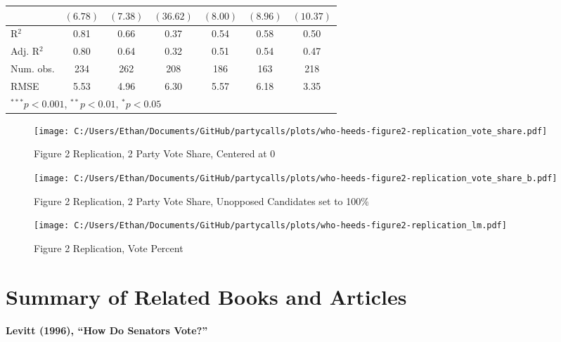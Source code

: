 \documentclass[12pt]{article}
\begin{document}
\begin{table}
\begin{center}
\begin{tabular}{l c c c c c c }
			& $(6.78)$      & $(7.38)$     & $(36.62)$    & $(8.00)$     & $(8.96)$      & $(10.37)$     \\
			\hline
			R$^2$                  & 0.81          & 0.66         & 0.37         & 0.54         & 0.58          & 0.50          \\
			Adj. R$^2$             & 0.80          & 0.64         & 0.32         & 0.51         & 0.54          & 0.47          \\
			Num. obs.              & 234           & 262          & 208          & 186          & 163           & 218           \\
			RMSE                   & 5.53          & 4.96         & 6.30         & 5.57         & 6.18          & 3.35          \\
			\hline
			\multicolumn{7}{l}{\scriptsize{$^{***}p<0.001$, $^{**}p<0.01$, $^*p<0.05$}}
		\end{tabular}
	\end{center}
\end{table}

\begin{figure}[H]
	\centering
	\caption{Figure 2 Replication, 2 Party Vote Share, Centered at 0}
	\texttt{[image: C:/Users/Ethan/Documents/GitHub/partycalls/plots/who-heeds-figure2-replication\_vote\_share.pdf]}
\end{figure}

\begin{figure}[H]
	\centering
	\caption{Figure 2 Replication, 2 Party Vote Share, Unopposed Candidates set to 100\%}
	\texttt{[image: C:/Users/Ethan/Documents/GitHub/partycalls/plots/who-heeds-figure2-replication\_vote\_share\_b.pdf]}
\end{figure}

\begin{figure}[H]
	\centering
	\caption{Figure 2 Replication, Vote Percent}
	\texttt{[image: C:/Users/Ethan/Documents/GitHub/partycalls/plots/who-heeds-figure2-replication\_lm.pdf]}
\end{figure}



\pagebreak



\section{Summary of Related Books and Articles}

\noindent
\textbf{Levitt (1996), ``How Do Senators Vote?''}
\end{document}
